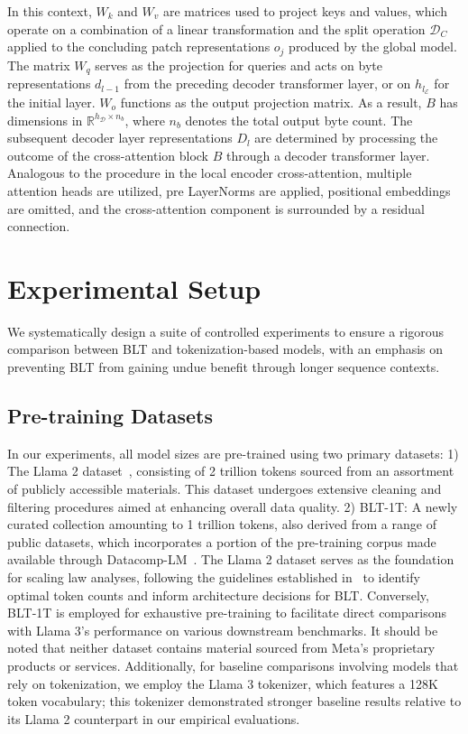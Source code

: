 In this context, $W_k$ and $W_v$ are matrices used to project keys and values, which operate on a combination of a linear transformation and the split operation $\mathcal{D}_C$ applied to the concluding patch representations $o_j$ produced by the global model. The matrix $W_q$ serves as the projection for queries and acts on byte representations $d_{l-1}$ from the preceding decoder transformer layer, or on $h_{l_{\mathcal{E}}}$ for the initial layer. $W_o$ functions as the output projection matrix. As a result, $B$ has dimensions in $\mathbb{R}^{h_{\mathcal{D}} \times n_b}$, where $n_b$ denotes the total output byte count. The subsequent decoder layer representations $D_l$ are determined by processing the outcome of the cross-attention block $B$ through a decoder transformer layer. Analogous to the procedure in the local encoder cross-attention, multiple attention heads are utilized, pre LayerNorms are applied, positional embeddings are omitted, and the cross-attention component is surrounded by a residual connection.

\section{Experimental Setup}
\label{section:experiments}
We systematically design a suite of controlled experiments to ensure a rigorous comparison between {\textsc BLT} and tokenization-based models, with an emphasis on preventing {\textsc BLT} from gaining undue benefit through longer sequence contexts.

\subsection{Pre-training Datasets} In our experiments, all model sizes are pre-trained using two primary datasets: 1) The Llama 2 dataset~\citep{touvron2023llama}, consisting of 2 trillion tokens sourced from an assortment of publicly accessible materials. This dataset undergoes extensive cleaning and filtering procedures aimed at enhancing overall data quality. 2) {\textsc BLT}-1T: A newly curated collection amounting to 1 trillion tokens, also derived from a range of public datasets, which incorporates a portion of the pre-training corpus made available through Datacomp-LM~\citep{li2024datacomp}. The Llama 2 dataset serves as the foundation for scaling law analyses, following the guidelines established in~\cite{dubey2024llama} to identify optimal token counts and inform architecture decisions for {\textsc BLT}. Conversely, {\textsc BLT}-1T is employed for exhaustive pre-training to facilitate direct comparisons with Llama 3's performance on various downstream benchmarks. It should be noted that neither dataset contains material sourced from Meta's proprietary products or services. Additionally, for baseline comparisons involving models that rely on tokenization, we employ the Llama 3 tokenizer, which features a 128K token vocabulary; this tokenizer demonstrated stronger baseline results relative to its Llama 2 counterpart in our empirical evaluations.

